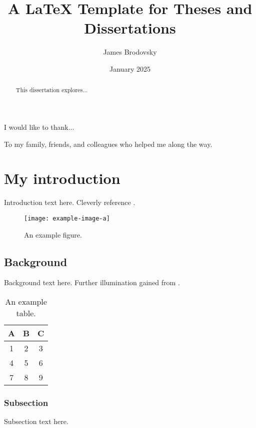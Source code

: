 \documentclass{thesis-dissertation}
\title{A \LaTeX{} Template for Theses and Dissertations}
\author{James Brodovsky}
\date{January 2025}             %
\begin{document}
\maketitlepage

\begin{abstract}
  This dissertation explores...
\end{abstract}

\begin{acknowledgments}
I would like to thank...
\end{acknowledgments}

\begin{dedication}
  To my family, friends, and colleagues who helped me along the way.
\end{dedication}

\tableofcontents

\listoffigures

\listoftables

\chapter{My introduction}
Introduction text here. Cleverly reference \cite{doe2023example}.

\lipsum[1-2]

\begin{figure}
  \centering
  \texttt{[image: example-image-a]}
  \caption{An example figure.}
  \label{fig:example-image-a}
\end{figure}

\section{Background}
Background text here. Further illumination gained from \cite{johnson2021conference}.
\lipsum[3-4]
\begin{table}
  \centering
  \begin{tabular}{|c|c|c|}
    \hline
    A & B & C \\
    \hline
    1 & 2 & 3 \\
    4 & 5 & 6 \\
    7 & 8 & 9 \\
    \hline
  \end{tabular}
  \caption{An example table.}
  \label{tab:example-table}
\end{table}

\subsection{Subsection}
Subsection text here.
\lipsum[5-6]
\end{document}
